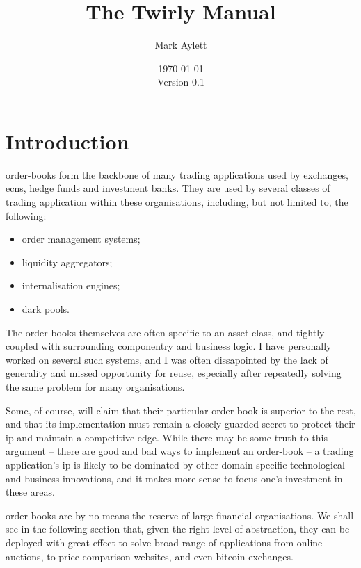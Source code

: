 \documentclass[11pt,a4paper]{article}
\begin{document}
\title{The Twirly Manual}
\author{Mark Aylett}
\date{\today\\Version 0.1}
\maketitle

\tableofcontents

\section{Introduction}

\Glspl{order-book} form the backbone of many trading applications used by \glspl{exchange},
\glspl{ecn}, hedge funds and investment banks. They are used by several classes of trading
application within these organisations, including, but not limited to, the following:

\begin{itemize}
\item order management systems;
\item liquidity aggregators;
\item internalisation engines;
\item dark pools.
\end{itemize}

The \glspl{order-book} themselves are often specific to an \gls{asset}-class, and tightly coupled
with surrounding componentry and business logic. I have personally worked on several such systems,
and I was often dissapointed by the lack of generality and missed opportunity for reuse, especially
after repeatedly solving the same problem for many organisations.

Some, of course, will claim that their particular \gls{order-book} is superior to the rest, and that
its implementation must remain a closely guarded secret to protect their \gls{ip} and maintain a
competitive edge. While there may be some truth to this argument -- there are good and bad ways to
implement an \gls{order-book} -- a trading application's \gls{ip} is likely to be dominated by other
domain-specific technological and business innovations, and it makes more sense to focus one's
investment in these areas.

\Glspl{order-book} are by no means the reserve of large financial organisations. We shall see in the
following section that, given the right level of abstraction, they can be deployed with great effect
to solve broad range of applications from online \glspl{auction}, to price comparison websites, and
even \gls{bitcoin} \glspl{exchange}.
\end{document}
